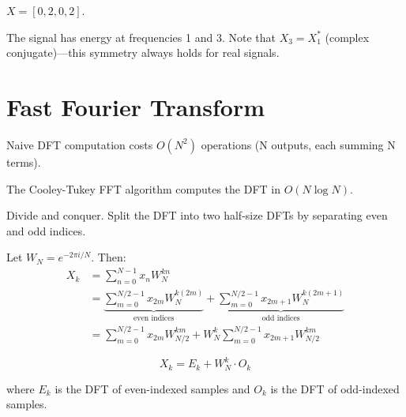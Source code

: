 
 $X = [0, 2, 0, 2]$.

The signal has energy at frequencies 1 and 3. Note that $X_3 = X_1^*$ (complex conjugate)---this symmetry always holds for real signals.




\newpage
\section{Fast Fourier Transform}

 Naive DFT computation costs $O(N^2)$ operations (N outputs, each summing N terms).

 The Cooley-Tukey FFT algorithm computes the DFT in $O(N \log N)$.

 Divide and conquer. Split the DFT into two half-size DFTs by separating even and odd indices.

Let $W_N = e^{-2\pi i/N}$. Then:
\begin{align}
    X_k &= \sum_{n=0}^{N-1} x_n W_N^{kn} \\
    &= \underbrace{\sum_{m=0}^{N/2-1} x_{2m} W_N^{k(2m)}}_{\text{even indices}} + \underbrace{\sum_{m=0}^{N/2-1} x_{2m+1} W_N^{k(2m+1)}}_{\text{odd indices}} \\
    &= \sum_{m=0}^{N/2-1} x_{2m} W_{N/2}^{km} + W_N^k \sum_{m=0}^{N/2-1} x_{2m+1} W_{N/2}^{km}
\end{align}

\begin{equation}
    \boxed{X_k = E_k + W_N^k \cdot O_k}
\end{equation}

where $E_k$ is the DFT of even-indexed samples and $O_k$ is the DFT of odd-indexed samples.



